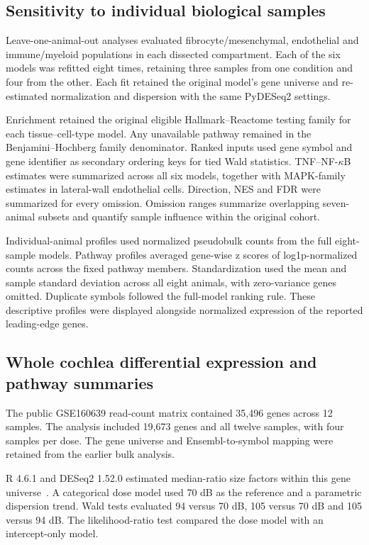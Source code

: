 \subsection{Sensitivity to individual biological samples}

Leave-one-animal-out analyses evaluated fibrocyte/\allowbreak{}mesenchymal, endothelial and immune/\allowbreak{}myeloid populations in each dissected compartment. Each of the six models was refitted eight times, retaining three samples from one condition and four from the other. Each fit retained the original model's gene universe and re-estimated normalization and dispersion with the same PyDESeq2 settings.

Enrichment retained the original eligible Hallmark--Reactome testing family for each tissue--cell-type model. Any unavailable pathway remained in the Benjamini--Hochberg family denominator. Ranked inputs used gene symbol and gene identifier as secondary ordering keys for tied Wald statistics. TNF--NF-\(\kappa\)B estimates were summarized across all six models, together with MAPK-family estimates in lateral-wall endothelial cells. Direction, NES and FDR were summarized for every omission. Omission ranges summarize overlapping seven-animal subsets and quantify sample influence within the original cohort.

Individual-animal profiles used normalized pseudobulk counts from the full eight-sample models. Pathway profiles averaged gene-wise z scores of log1p-normalized counts across the fixed pathway members. Standardization used the mean and sample standard deviation across all eight animals, with zero-variance genes omitted. Duplicate symbols followed the full-model ranking rule. These descriptive profiles were displayed alongside normalized expression of the reported leading-edge genes.

\subsection{Whole cochlea differential expression and pathway summaries}

The public GSE160639 read-count matrix contained 35,496 genes across 12 samples. The analysis included 19,673 genes and all twelve samples, with four samples per dose. The gene universe and Ensembl-to-symbol mapping were retained from the earlier bulk analysis.

R 4.6.1 and DESeq2 1.52.0 estimated median-ratio size factors within this gene universe~\citep{Love2014}. A categorical dose model used 70 dB as the reference and a parametric dispersion trend. Wald tests evaluated 94 versus 70 dB, 105 versus 70 dB and 105 versus 94 dB. The likelihood-ratio test compared the dose model with an intercept-only model.

